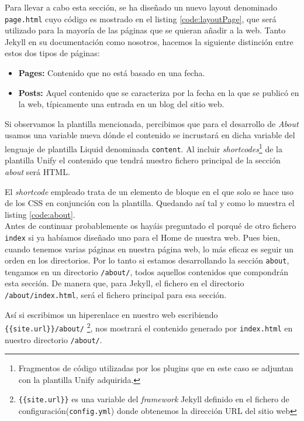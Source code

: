 Para llevar a cabo esta sección, se ha diseñado un nuevo layout denominado \texttt{page.html} cuyo código es mostrado en el listing \ref{code:layoutPage}, que será utilizado para la mayoría de las páginas que se quieran añadir a la web. Tanto Jekyll en su documentación como nosotros, hacemos la siguiente distinción entre estos dos tipos de páginas:

\begin{itemize}
    \item \textbf{Pages: } Contenido que no está basado en una fecha.
    \item \textbf{Posts: } Aquel contenido que se caracteriza por la fecha en la que se publicó en la web, típicamente una entrada en un blog del sitio web.
\end{itemize}


Si observamos la plantilla mencionada, percibimos que para el desarrollo de \textit{About} usamos una variable nueva dónde el contenido se incrustará en  dicha variable del lenguaje de plantilla Liquid denominada \texttt{content}. Al incluir \textit{shortcodes}\footnote{Fragmentos de código utilizadas por los plugins que en este caso se adjuntan con la plantilla Unify adquirida.} de la plantilla Unify el contenido que tendrá nuestro fichero principal de la sección \textit{about} será HTML.

El \textit{shortcode} empleado trata de un elemento de bloque en el que solo se hace uso de los CSS en conjunción con la plantilla. Quedando así tal y como lo muestra el listing \ref{code:about}. \\

Antes de continuar probablemente os hayáis preguntado el porqué de otro fichero \texttt{index} si ya habíamos diseñado uno para el Home de nuestra web. Pues bien,  cuando tenemos varias páginas en nuestra página web, lo más eficaz es seguir un orden en los directorios. Por lo tanto si estamos desarrollando la sección \texttt{about}, tengamos en un directorio \texttt{/about/}, todos aquellos contenidos que compondrán esta sección. De manera que, para Jekyll, el fichero en el directorio \texttt{/about/index.html}, será el fichero principal para esa sección.

Así si escribimos un hiperenlace en nuestro web escribiendo \texttt{\{\{site.url\}\}/about/} \footnote{\texttt{\{\{site.url\}\}} es una variable del \textit{framework} Jekyll definido en el fichero de configuración(\texttt{config.yml}) donde obtenemos la dirección URL del sitio web}, nos mostrará el contenido generado por \texttt{index.html} en nuestro directorio \texttt{/about/}.


